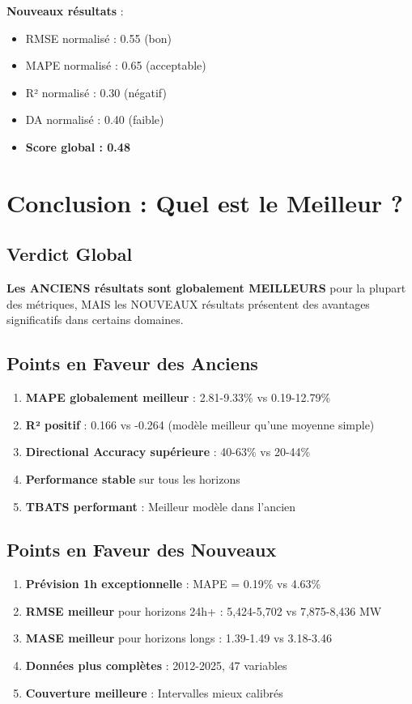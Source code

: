 \documentclass[12pt,a4paper]{article}
\begin{document}
\textbf{Nouveaux résultats} :
\begin{itemize}
    \item RMSE normalisé : 0.55 (bon)
    \item MAPE normalisé : 0.65 (acceptable)
    \item R² normalisé : 0.30 (négatif)
    \item DA normalisé : 0.40 (faible)
    \item \textbf{Score global : 0.48}
\end{itemize}

\section{Conclusion : Quel est le Meilleur ?}

\subsection{Verdict Global}

\textbf{Les ANCIENS résultats sont globalement MEILLEURS} pour la plupart des métriques, MAIS les NOUVEAUX résultats présentent des avantages significatifs dans certains domaines.

\subsection{Points en Faveur des Anciens}

\begin{enumerate}
    \item \textbf{MAPE globalement meilleur} : 2.81-9.33\% vs 0.19-12.79\%
    \item \textbf{R² positif} : 0.166 vs -0.264 (modèle meilleur qu'une moyenne simple)
    \item \textbf{Directional Accuracy supérieure} : 40-63\% vs 20-44\%
    \item \textbf{Performance stable} sur tous les horizons
    \item \textbf{TBATS performant} : Meilleur modèle dans l'ancien
\end{enumerate}

\subsection{Points en Faveur des Nouveaux}

\begin{enumerate}
    \item \textbf{Prévision 1h exceptionnelle} : MAPE = 0.19\% vs 4.63\%
    \item \textbf{RMSE meilleur} pour horizons 24h+ : 5,424-5,702 vs 7,875-8,436 MW
    \item \textbf{MASE meilleur} pour horizons longs : 1.39-1.49 vs 3.18-3.46
    \item \textbf{Données plus complètes} : 2012-2025, 47 variables
    \item \textbf{Couverture meilleure} : Intervalles mieux calibrés
\end{enumerate}
\end{document}
